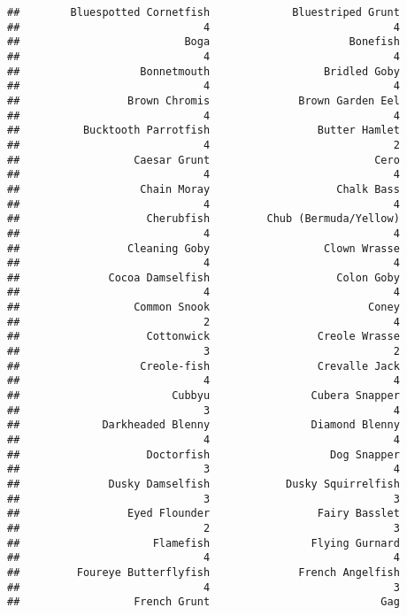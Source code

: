 \documentclass[
]{article}
\begin{document}
\begin{verbatim}
##        Bluespotted Cornetfish             Bluestriped Grunt 
##                             4                             4 
##                          Boga                      Bonefish 
##                             4                             4 
##                   Bonnetmouth                  Bridled Goby 
##                             4                             4 
##                 Brown Chromis              Brown Garden Eel 
##                             4                             4 
##          Bucktooth Parrotfish                 Butter Hamlet 
##                             4                             2 
##                  Caesar Grunt                          Cero 
##                             4                             4 
##                   Chain Moray                    Chalk Bass 
##                             4                             4 
##                    Cherubfish         Chub (Bermuda/Yellow) 
##                             4                             4 
##                 Cleaning Goby                  Clown Wrasse 
##                             4                             4 
##              Cocoa Damselfish                    Colon Goby 
##                             4                             4 
##                  Common Snook                         Coney 
##                             2                             4 
##                    Cottonwick                 Creole Wrasse 
##                             3                             2 
##                   Creole-fish                 Crevalle Jack 
##                             4                             4 
##                        Cubbyu                Cubera Snapper 
##                             3                             4 
##             Darkheaded Blenny                Diamond Blenny 
##                             4                             4 
##                    Doctorfish                   Dog Snapper 
##                             3                             4 
##              Dusky Damselfish            Dusky Squirrelfish 
##                             3                             3 
##                 Eyed Flounder                 Fairy Basslet 
##                             2                             3 
##                     Flamefish                Flying Gurnard 
##                             4                             4 
##         Foureye Butterflyfish              French Angelfish 
##                             4                             3 
##                  French Grunt                           Gag 

\end{verbatim}
\end{document}
